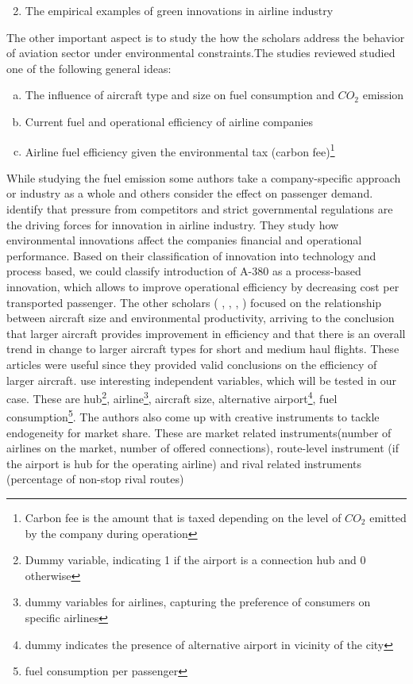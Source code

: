 \documentclass[titlepage, 11pt]{article}
\begin{document}
\tab 
\begin{enumerate}
\setcounter{enumi}{1}
\item The empirical examples of green innovations in airline industry
\end{enumerate}
\tab The other important aspect is to study the how the scholars address the behavior of aviation sector under environmental constraints.The studies reviewed studied one of the following general ideas:
\begin{enumerate}[a)]
\item The influence of aircraft type and size on fuel consumption and $CO_2$ emission 
\item Current fuel and operational efficiency of airline companies
\item Airline fuel efficiency  given the environmental tax (carbon fee)\footnote{Carbon fee is the amount that is taxed depending on the level of $CO_2$ emitted by the company during operation}
\end{enumerate}
\tab While studying the fuel emission some authors take a company-specific approach or industry as a whole and others consider the effect on passenger demand. \citeauthor{Emer1} \cite{Emer1} identify that pressure from competitors and strict governmental regulations are the driving forces for innovation in airline industry. They study how environmental innovations affect the companies financial and operational performance. Based on their classification of innovation into technology and process based, we could classify introduction of A-380 as a process-based innovation, which allows to improve operational efficiency by decreasing cost per transported passenger. The other scholars (\citeauthor{COEurope} \cite{COEurope}, \citeauthor{seatconfig} \cite{seatconfig}, \citeauthor{larger} \cite{larger}, \citeauthor{threeMarket} \cite{threeMarket}) focused on the relationship between aircraft size and environmental productivity, arriving to the conclusion that larger aircraft provides improvement in efficiency and that there is an overall trend in change to larger aircraft types for short and medium haul flights. These articles were useful since they provided valid conclusions on the efficiency of larger aircraft. \citeauthor{carbon} \cite{carbon} use interesting independent variables, which will be tested in our case. These are hub\footnote{Dummy variable, indicating 1 if the airport is a connection hub and 0 otherwise}, airline\footnote{dummy variables for airlines, capturing the preference of consumers on specific airlines}, aircraft size, alternative airport\footnote{dummy indicates the presence of alternative airport in vicinity of the city}, fuel consumption\footnote{fuel consumption per passenger}. The authors also come up with creative instruments to tackle endogeneity for market share. These are market related instruments(number of airlines on the market, number of offered connections), route-level instrument (if the airport is hub for the operating airline) and rival related instruments (percentage of non-stop rival routes\cite{carbon})\\
\end{document}

